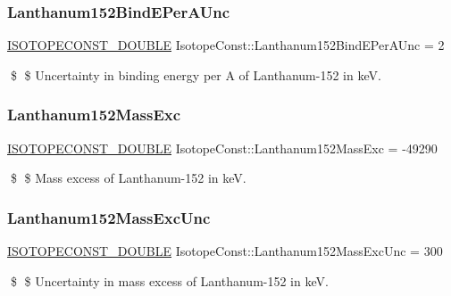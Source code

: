 \subsubsection{\texorpdfstring{Lanthanum152\+Bind\+E\+Per\+A\+Unc}{Lanthanum152BindEPerAUnc}}
{\footnotesize\ttfamily \mbox{\hyperlink{group___isotope_const-_macros_ga8f45a7272ce02c0b4c65c44636ed719a}{I\+S\+O\+T\+O\+P\+E\+C\+O\+N\+S\+T\+\_\+\+D\+O\+U\+B\+LE}} Isotope\+Const\+::\+Lanthanum152\+Bind\+E\+Per\+A\+Unc = 2}

\$ \$ Uncertainty in binding energy per A of Lanthanum-\/152 in keV. \mbox{\label{group___isotope_const-_lanthanum-_la152_gabb71b6f5b452ea85a2e40ca3df3b9cee}} 
\subsubsection{\texorpdfstring{Lanthanum152\+Mass\+Exc}{Lanthanum152MassExc}}
{\footnotesize\ttfamily \mbox{\hyperlink{group___isotope_const-_macros_ga8f45a7272ce02c0b4c65c44636ed719a}{I\+S\+O\+T\+O\+P\+E\+C\+O\+N\+S\+T\+\_\+\+D\+O\+U\+B\+LE}} Isotope\+Const\+::\+Lanthanum152\+Mass\+Exc = -\/49290}

\$ \$ Mass excess of Lanthanum-\/152 in keV. \mbox{\label{group___isotope_const-_lanthanum-_la152_gaae88aaec4e2b27643a0a87453870308f}} 
\subsubsection{\texorpdfstring{Lanthanum152\+Mass\+Exc\+Unc}{Lanthanum152MassExcUnc}}
{\footnotesize\ttfamily \mbox{\hyperlink{group___isotope_const-_macros_ga8f45a7272ce02c0b4c65c44636ed719a}{I\+S\+O\+T\+O\+P\+E\+C\+O\+N\+S\+T\+\_\+\+D\+O\+U\+B\+LE}} Isotope\+Const\+::\+Lanthanum152\+Mass\+Exc\+Unc = 300}

\$ \$ Uncertainty in mass excess of Lanthanum-\/152 in keV. \mbox{\label{group___isotope_const-_lanthanum-_la152_gad9c4a5deae326c0c8f46b177d63a30b4}} 
